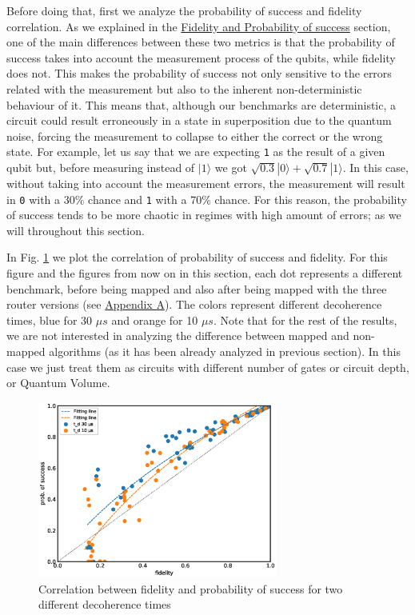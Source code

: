 Before doing that, first we analyze the probability of success and fidelity correlation.
As we explained in the \hyperref[sec:org0c7b2c2]{Fidelity and Probability of success} section, one of the main differences between these two metrics is that the probability of success takes into account the measurement process of the qubits, while fidelity does not.
This makes the probability of success not only sensitive to the errors related with the measurement but also to the inherent non-deterministic behaviour of it.
This means that, although our benchmarks are deterministic, a circuit could result erroneously in a state in superposition due to the quantum noise, forcing the measurement to collapse to either the correct or the wrong state.
For example, let us say that we are expecting \texttt{1} as the result of a given qubit but, before measuring instead of \(|1\rangle\) we got \(\sqrt{0.3} |0\rangle + \sqrt{0.7} |1\rangle\).
In this case, without taking into account the measurement errors, the measurement will result in \texttt{0} with a 30\% chance and \texttt{1} with a 70\% chance.
For this reason, the probability of success tends to be more chaotic in regimes with high amount of errors; as we will throughout this section.



In Fig. \ref{fig:f_ps_correlation_with_meas_error} we plot the correlation of probability of success and fidelity. 
For this figure and the figures from now on in this section, each dot represents  a different benchmark, before being mapped and also after being mapped with the three router versions (see \href{appendix-1.org}{Appendix A}). The colors represent different decoherence times, blue for 30 \(\mu s\) and orange for 10 \(\mu s\).
Note that for the rest of the results, we are not interested in analyzing the difference between mapped and non-mapped algorithms (as it has been already analyzed in previous section).
In this case we just treat them as circuits with different number of gates or circuit depth, or Quantum Volume.


\begin{figure}[htbp]
\centering
\includegraphics[width=0.7\textwidth]{figures/f_ps_correlation.eps}
\caption{\label{fig:f_ps_correlation_with_meas_error}
Correlation between fidelity and probability of success for two different decoherence times}
\end{figure}




